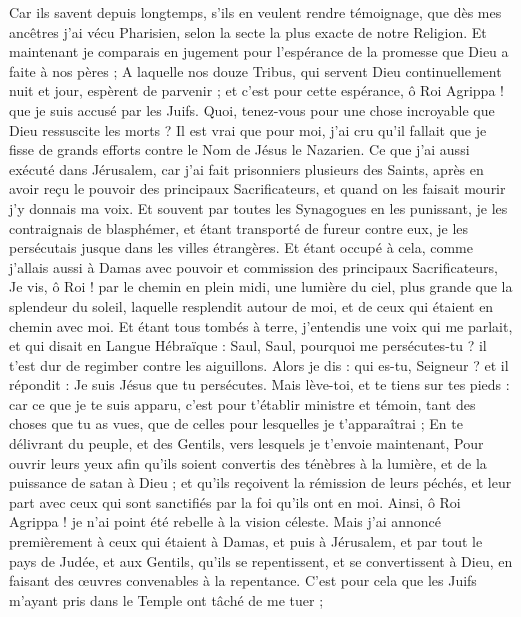 \begin{multicols}{2}
Car ils savent depuis longtemps, s'ils en veulent rendre témoignage, que dès mes ancêtres j'ai vécu Pharisien, selon la secte la plus exacte de notre Religion.
Et maintenant je comparais en jugement pour l'espérance de la promesse que Dieu a faite à nos pères ;
A laquelle nos douze Tribus, qui servent Dieu continuellement nuit et jour, espèrent de parvenir ; et c'est pour cette espérance, ô Roi Agrippa ! que je suis accusé par les Juifs.
Quoi, tenez-vous pour une chose incroyable que Dieu ressuscite les morts ?
Il est vrai que pour moi, j'ai cru qu'il fallait que je fisse de grands efforts contre le Nom de Jésus le Nazarien.
Ce que j'ai aussi exécuté dans Jérusalem, car j'ai fait prisonniers plusieurs des Saints, après en avoir reçu le pouvoir des principaux Sacrificateurs, et quand on les faisait mourir j'y donnais ma voix.
Et souvent par toutes les Synagogues en les punissant, je les contraignais de blasphémer, et étant transporté de fureur contre eux, je les persécutais jusque dans les villes étrangères.
Et étant occupé à cela, comme j'allais aussi à Damas avec pouvoir et commission des principaux Sacrificateurs,
Je vis, ô Roi ! par le chemin en plein midi, une lumière du ciel, plus grande que la splendeur du soleil, laquelle resplendit autour de moi, et de ceux qui étaient en chemin avec moi.
Et étant tous tombés à terre, j'entendis une voix qui me parlait, et qui disait en Langue Hébraïque : Saul, Saul, pourquoi me persécutes-tu ? il t'est dur de regimber contre les aiguillons.
Alors je dis : qui es-tu, Seigneur ? et il répondit : Je suis Jésus que tu persécutes.
Mais lève-toi, et te tiens sur tes pieds : car ce que je te suis apparu, c'est pour t'établir ministre et témoin, tant des choses que tu as vues, que de celles pour lesquelles je t'apparaîtrai ;
En te délivrant du peuple, et des Gentils, vers lesquels je t'envoie maintenant,
Pour ouvrir leurs yeux afin qu'ils soient convertis des ténèbres à la lumière, et de la puissance de satan à Dieu ; et qu'ils reçoivent la rémission de leurs péchés, et leur part avec ceux qui sont sanctifiés par la foi qu'ils ont en moi.
Ainsi, ô Roi Agrippa ! je n'ai point été rebelle à la vision céleste.
Mais j'ai annoncé premièrement à ceux qui étaient à Damas, et puis à Jérusalem, et par tout le pays de Judée, et aux Gentils, qu'ils se repentissent, et se convertissent à Dieu, en faisant des œuvres convenables à la repentance.
C'est pour cela que les Juifs m'ayant pris dans le Temple ont tâché de me tuer ;

\end{multicols}
